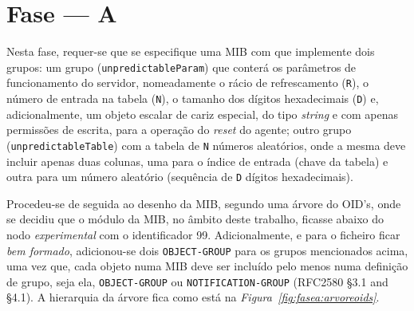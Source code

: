 \section{Fase --- A}

Nesta fase, requer-se que se especifique uma MIB com que implemente dois grupos:
um grupo (\texttt{unpredictableParam}) que conterá os parâmetros de
funcionamento do servidor, nomeadamente o rácio de refrescamento (\texttt{R}),
o número de entrada na tabela (\texttt{N}), o tamanho dos dígitos hexadecimais
(\texttt{D}) e, adicionalmente, um objeto escalar de cariz especial, do tipo
\emph{string} e com apenas permissões de escrita, para a operação do
\emph{reset} do agente; outro grupo (\texttt{unpredictableTable}) com a tabela
de \texttt{N} números aleatórios, onde a mesma deve incluir apenas duas colunas,
uma para o índice de entrada (chave da tabela) e outra para um número aleatório
(sequência de \texttt{D} dígitos hexadecimais).

Procedeu-se de seguida ao desenho da MIB, segundo uma árvore do OID's, onde se
decidiu que o módulo da MIB, no âmbito deste trabalho, ficasse abaixo do nodo
\emph{experimental} com o identificador 99. Adicionalmente, e para o ficheiro
ficar \emph{bem formado}, adicionou-se dois \texttt{OBJECT-GROUP} para os grupos
mencionados acima, uma vez que, cada objeto numa MIB deve ser incluído pelo
menos numa definição de grupo, seja ela, \texttt{OBJECT-GROUP} ou
\texttt{NOTIFICATION-GROUP} (RFC2580 §3.1 and §4.1). A hierarquia da árvore fica
como está na \emph{Figura~\ref{fig:fasea:arvoreoids}}. 



